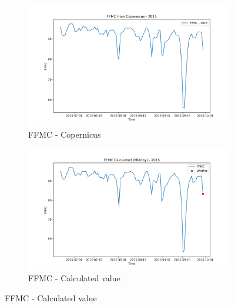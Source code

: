 \begin{figure}[h]
\caption{Comparison of FFMC calculated values and Copernicus at midday}
    \centering
    \begin{subfigure}{0.49\textwidth}
        \centering
        \includegraphics[width=\textwidth]{graphs/2015/2015CopernicusFFMC12.png}
        \caption{FFMC - Copernicus}
        \label{fig:ffmc_copernicus_2015_midday}
    \end{subfigure}
    \hfill
    \begin{subfigure}{0.49\textwidth}
        \centering
        \includegraphics[width=\textwidth]{graphs/2015/2015CalcFFMC12.png}
        \caption{FFMC - Calculated value}
        \label{fig:ffmc_calculated_2015_midday}
    \end{subfigure}
    \label{fig:comparison_ffmc_midday_copernicus_calculated}
\end{figure}

